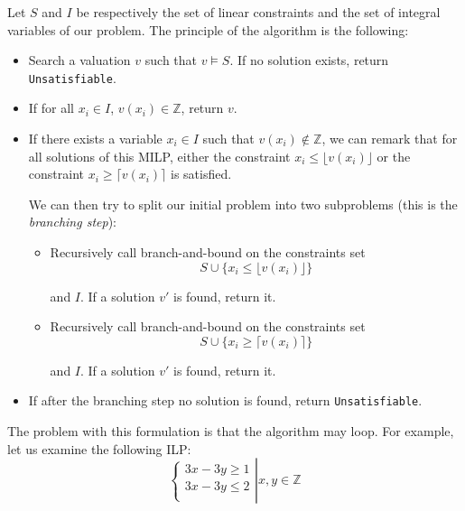 \documentclass{article}
\newcommand{\cunsat}{\texttt{Unsatisfiable}}
\newcommand{\ints}{\mathbb{Z}}
\begin{document}
Let $S$ and $I$ be respectively the set of linear constraints and the set of
integral variables of our problem. The principle of the algorithm is the
following:
\begin{itemize}
  \item Search a valuation $v$ such that $v \vDash S$. If no solution exists,
    return \cunsat{}.
  \item If for all $x_i \in I$, $v(x_i) \in \ints$,  return $v$.
  \item If there exists a variable $x_i \in I$ such that
    $v(x_i) \notin \ints$, we can remark that for all solutions of this
    MILP, either the constraint $x_i \leqslant \lfloor v(x_i) \rfloor$ 
    or the constraint $x_i \geqslant \lceil v(x_i) \rceil$ is satisfied.
    
    We can then try to split our initial problem into two subproblems (this is
    the \textit{branching step}):
    \begin{itemize}
      \item Recursively call branch-and-bound on the constraints set
        $$S \cup \{x_i \leqslant \lfloor v(x_i) \rfloor\}$$
        
        and $I$.
        If a solution $v'$ is found, return it.
      \item Recursively call branch-and-bound on the constraints set
        $$S \cup \{x_i \geqslant \lceil v(x_i) \rceil\}$$
        
        and $I$.
        If a solution $v'$ is found, return it.
    \end{itemize}
  \item If after the branching step no solution is found, return \cunsat{}.
\end{itemize}

%

The problem with this formulation is that the algorithm may loop. For example,
let us examine the following ILP:
\begin{equation} \label{pbloop}
  \left\{
  \begin{array}{l}
    3x - 3y \geqslant 1 \\
    3x - 3y \leqslant 2 \\
  \end{array}
  \right|
  x, y \in \ints
\end{equation}
\end{document}
